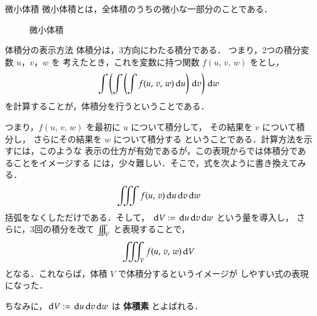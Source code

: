     \begin{memo}{微小体積}
        微小体積とは，全体積のうちの微小な一部分のことである．
        \begin{figure}[hbt]
            \begin{center}
                \caption{微小体積}
                \label{fig:EM_smollV}
            \end{center}
        \end{figure}
    \end{memo}

    \begin{memo}{体積分の表示方法}
        体積分は，3方向にわたる積分である．
        つまり，2つの積分変数 $u$，$v$，$w$ を
        考えたとき，これを変数に持つ関数 $f(u,\,v,\,w)$ をとし，
            \begin{equation*}
                \int \left(
                    \int \left(
                        \int f(u,\,v,\,w) \,\mathrm{d} u
                    \right)  \,\mathrm{d} v
                \right) \,\mathrm{d} w
            \end{equation*}
        を計算することが，体積分を行うということである．

        つまり，$f(u,\,v,\,w)$ を最初に $u$ について積分して，
        その結果を $v$ について積分し，
        さらにその結果を $w$ について積分する
        ということである．計算方法を示すには，このような
        表示の仕方が有効であるが，この表現からでは体積分であることをイメージする
        には，少々難しい．そこで，式を次ように書き換えてみる．
            \begin{equation*}
                 \int\mspace{-11mu}\int\mspace{-11mu}\int f(u,\,v) \,\mathrm{d} u \,\mathrm{d} v \,\mathrm{d} w
            \end{equation*}
        括弧をなくしただけである．そして，
        $\,\mathrm{d} V := \,\mathrm{d} u\,\mathrm{d} v \,\mathrm{d} w$ という量を導入し，
        さらに，3回の積分を改て $\int\mspace{-11mu}\int\mspace{-11mu}\int_{V}$ と表現することで，
            \begin{equation*}
                \int\mspace{-11mu}\int\mspace{-11mu}\int_{V} f(u,\,v,\,w) \,\mathrm{d} V
            \end{equation*}
        となる．これならば，体積 $V$ で体積分するというイメージが
        しやすい式の表現になった．

        ちなみに，$\,\mathrm{d} V := \,\mathrm{d} u\,\mathrm{d} v\,\mathrm{d} w$ は \textbf{体積素} とよばれる．
    \end{memo}


